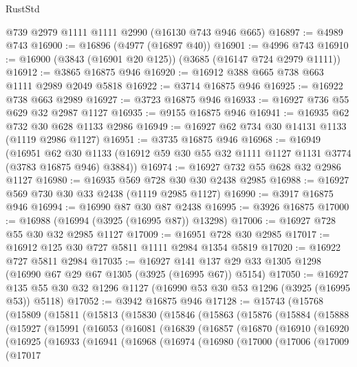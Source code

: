 \begin{lexlean}{RustStd}
\begin{coremodule}
    @739
    @2979
    @1111
    @1111
    @2990
    (@16130 @743 @946 @665)
@16897 := @4989 @743
@16900 := @16896 (@4977 (@16897 @40))
@16901 := @4996 @743
@16910 := @16900 (@3843 (@16901 @20 @125)) (@3685 (@16147 @724 @2979 @1111))
@16912 := @3865 @16875 @946
@16920 := @16912 @388 @665 @738 @663 @1111 @2989 @2049 @5818
@16922 := @3714 @16875 @946
@16925 := @16922 @738 @663 @2989
@16927 := @3723 @16875 @946
@16933 := @16927 @736 @55 @629 @32 @2987 @1127
@16935 := @9155 @16875 @946
@16941 := @16935 @62 @732 @30 @628 @1133 @2986
@16949 := @16927 @62 @734 @30 @14131 @1133 (@1119 @2986 @1127)
@16951 := @3735 @16875 @946
@16968 := @16949
    (@16951
      @62
      @30
      @1133
      (@16912 @59 @30 @55 @32 @1111 @1127 @1131 @3774 (@3783 @16875 @946) @3884))
@16974 := @16927 @732 @55 @628 @32 @2986 @1127
@16980 := @16935 @569 @728 @30 @30 @2438 @2985
@16988 := @16927 @569 @730 @30 @33 @2438 (@1119 @2985 @1127)
@16990 := @3917 @16875 @946
@16994 := @16990 @87 @30 @87 @2438
@16995 := @3926 @16875
@17000 := @16988 (@16994 (@3925 (@16995 @87)) @13298)
@17006 := @16927 @728 @55 @30 @32 @2985 @1127
@17009 := @16951 @728 @30 @2985
@17017 := @16912 @125 @30 @727 @5811 @1111 @2984 @1354 @5819
@17020 := @16922 @727 @5811 @2984
@17035 := @16927 @141 @137 @29 @33 @1305 @1298 (@16990 @67 @29 @67 @1305 (@3925 (@16995 @67)) @5154)
@17050 := @16927 @135 @55 @30 @32 @1296 @1127 (@16990 @53 @30 @53 @1296 (@3925 (@16995 @53)) @5118)
@17052 := @3942 @16875 @946
@17128 := @15743
    (@15768
      (@15809
        (@15811
          (@15813
            (@15830
              (@15846
                (@15863
                  (@15876
                    (@15884
                      (@15888
                        (@15927
                          (@15991
                            (@16053
                              (@16081
                                (@16839
                                  (@16857
                                    (@16870
                                      (@16910
                                        (@16920
                                          (@16925
                                            (@16933
                                              (@16941
                                                (@16968
                                                  (@16974
                                                    (@16980
                                                      (@17000
                                                        (@17006
                                                          (@17009
                                                            (@17017

\end{coremodule}
\end{lexlean}
